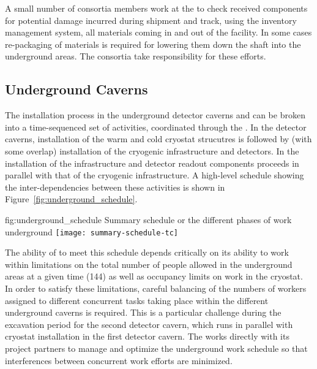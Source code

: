 A small number of  consortia members work at
the  to check received components for potential damage 
incurred during shipment and track, using the inventory management 
system, all materials coming in and out of the facility.  In some 
cases re-packaging of materials is required for lowering them down
the shaft into the underground areas.  The  consortia
take responsibility for these efforts.

\subsection{Underground Caverns}

The installation 
process in the underground detector caverns and  can 
be broken into a time-sequenced set of activities, coordinated 
through the .  In the detector caverns, installation 
of the warm and cold cryostat strucutres is followed by (with 
some overlap) installation of the cryogenic infrastructure and 
detectors.  In the  installation of the   
infrastructure and detector readout components proceeds in 
parallel with that of the cryogenic infrastructure.  A high-level 
schedule showing the inter-dependencies between these activities 
is shown in Figure~\ref{fig:underground_schedule}.
\begin{dunefigure}{fig:underground_schedule}
  {Summary schedule or the different phases of work underground}
  \texttt{[image: summary-schedule-tc]}
\end{dunefigure}

The ability of  to meet this schedule depends
critically on its ability to work within limitations on the total
number of people allowed in the underground areas at a given time
(144) as well as occupancy limits on work in the cryostat.  In order
to satisfy these limitations, careful balancing of the numbers of
workers assigned to different concurrent tasks taking place within the
different underground caverns is required.  This is a particular
challenge during the excavation period for the second detector cavern,
which runs in parallel with cryostat installation in the first
detector cavern.  The  works directly with its
 project partners to manage and optimize the
underground work schedule so that interferences between concurrent
work efforts are minimized.

